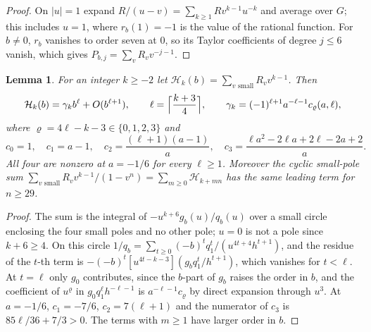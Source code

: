 \documentclass{amsart}
\newtheorem{lemma}[theorem]{Lemma}
\theoremstyle{definition}
\theoremstyle{remark}
\numberwithin{equation}{section}
\begin{document}
\begin{proof}
On $|u|=1$ expand $R/(u-v)=\sum_{k\ge1}Rv^{k-1}u^{-k}$ and average over $G$; this
includes $u=1$, where $r_b(1)=-1$ is the value of the rational function. For
$b\ne0$, $r_b$ vanishes to order seven at $0$, so its Taylor coefficients of degree
$j\le6$ vanish, which gives $P_{b,j}=\sum_vR_vv^{-j-1}$.
\end{proof}

\begin{lemma}\label{lem:smallpoles}
For an integer $k\ge-2$ let $\mathcal H_k(b)=\sum_{v\text{ small}}R_vv^{k-1}$. Then
\[
  \mathcal H_k(b)=\gamma_kb^\ell+O(b^{\ell+1}),\qquad \ell=\Bigl\lceil\frac{k+3}4
  \Bigr\rceil,\qquad \gamma_k=(-1)^{\ell+1}a^{-\ell-1}c_\varrho(a,\ell),
\]
where $\varrho=4\ell-k-3\in\{0,1,2,3\}$ and
\[
  c_0=1,\quad c_1=a-1,\quad c_2=\frac{(\ell+1)(a-1)}a,\quad
  c_3=\frac{\ell a^2-2\ell a+2\ell-2a+2}a .
\]
All four are nonzero at $a=-1/6$ for every $\ell\ge1$. Moreover the cyclic small-pole
sum $\sum_{v\text{ small}}R_vv^{k-1}/(1-v^n)=\sum_{m\ge0}\mathcal H_{k+mn}$ has the
same leading term for $n\ge29$.
\end{lemma}

\begin{proof}
The sum is the integral of $-u^{k+6}g_b(u)/q_b(u)$ over a small circle enclosing the
four small poles and no other pole; $u=0$ is not a pole since $k+6\ge4$. On this
circle
$1/q_b=\sum_{t\ge0}(-b)^tq_1^t/(u^{4t+4}h^{t+1})$, and the residue of the $t$-th term
is $-(-b)^t[u^{4t-k-3}](g_bq_1^t/h^{t+1})$, which vanishes for $t<\ell$. At $t=\ell$
only $g_0$ contributes, since the $b$-part of $g_b$ raises the order in $b$, and the
coefficient of $u^\varrho$ in $g_0q_1^\ell h^{-\ell-1}$ is $a^{-\ell-1}c_\varrho$ by
direct expansion through $u^3$. At $a=-1/6$, $c_1=-7/6$, $c_2=7(\ell+1)$ and the
numerator of $c_3$ is $85\ell/36+7/3>0$. The terms with $m\ge1$ have larger order in
$b$.
\end{proof}
\end{document}
